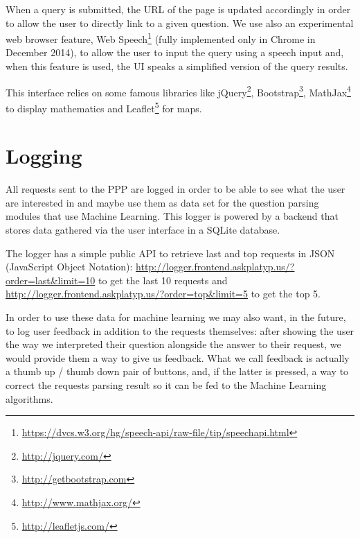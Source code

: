 When a query is submitted, the URL of the page is updated accordingly in order to allow the user to directly link to a given question. We use also an experimental web browser feature, Web Speech\footnote{\url{https://dvcs.w3.org/hg/speech-api/raw-file/tip/speechapi.html}} (fully implemented only in Chrome in December 2014), to allow the user to input the query using a speech input and, when this feature is used, the UI speaks a simplified version of the query results.

This interface relies on some famous libraries 
like jQuery\footnote{\url{http://jquery.com/}}, Bootstrap\footnote{\url{http://getbootstrap.com}}, MathJax\footnote{\url{http://www.mathjax.org/}} to display mathematics and Leaflet\footnote{\url{http://leafletjs.com/}} for maps.

\section{Logging}

All requests sent to the PPP are logged in order to be able to see what
the user are interested in and maybe use them as data set for the
question parsing modules that use Machine Learning. This logger
is powered by a backend that stores data
gathered via the user interface in a SQLite database.

The logger has a simple public API to retrieve last and top requests
in JSON (JavaScript Object Notation):
\url{http://logger.frontend.askplatyp.us/?order=last&limit=10} to get the
last 10 requests and \url{http://logger.frontend.askplatyp.us/?order=top&limit=5}
to get the top 5.

In order to use these data for machine learning we may also want, in the future,
to log user feedback in addition to the requests
themselves: after showing the user the way we interpreted their
question alongside the answer to their request, we would provide them a
way to give us feedback.
What we call feedback is actually a thumb up / thumb down pair of
buttons, and, if the latter is pressed, a way to correct the requests
parsing result so it can be fed to the Machine Learning algorithms.